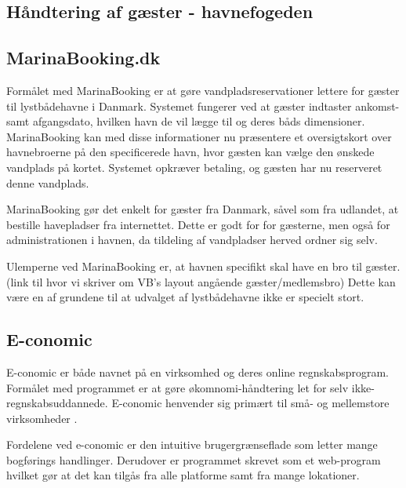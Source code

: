 \subsection{Håndtering af gæster - havnefogeden} %
\label{sub:havnefogeden}



\subsection{MarinaBooking.dk} %
\label{sub:MarinaBooking.dk}

Formålet med MarinaBooking \cite{marinabooking} er at gøre vandpladsreservationer lettere for gæster til lystbådehavne i Danmark. Systemet fungerer ved at gæster indtaster ankomst- samt afgangsdato, hvilken havn de vil lægge til og deres båds dimensioner. MarinaBooking kan med disse informationer nu præsentere et oversigtskort over havnebroerne på den specificerede havn, hvor gæsten kan vælge den ønskede vandplads på kortet. Systemet opkræver betaling, og gæsten har nu reserveret denne vandplads.

MarinaBooking gør det enkelt for gæster fra Danmark, såvel som fra udlandet, at bestille havepladser fra internettet. Dette er godt for for gæsterne, men også for administrationen i havnen, da tildeling af vandpladser herved ordner sig selv.

Ulemperne ved MarinaBooking er, at havnen specifikt skal have en bro til gæster. \sinote(link til hvor vi skriver om VB's layout angående gæster/medlemsbro) Dette kan være en af grundene til at udvalget af lystbådehavne ikke er specielt stort.


\subsection{E-conomic} %
\label{sub:E-conomic}

E-conomic er både navnet på en virksomhed og deres online regnskabsprogram. Formålet med programmet er at gøre økomnomi-håndtering let for selv ikke-regnskabsuddannede. E-conomic henvender sig primært til små- og mellemstore virksomheder \cite{economic}.

Fordelene ved e-conomic er den intuitive brugergrænseflade som letter mange bogførings handlinger. Derudover er programmet skrevet som et web-program hvilket gør at det kan tilgås fra alle platforme samt fra mange lokationer.



